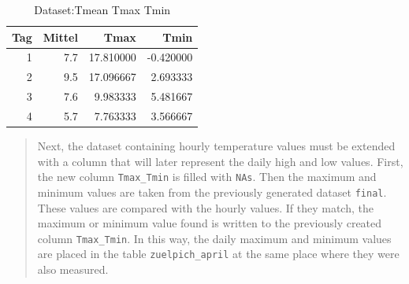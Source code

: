 \documentclass[
]{book}
\begin{document}
\begin{table}

\caption{\label{tab:unnamed-chunk-21}Dataset:Tmean Tmax Tmin}
\fontsize{10}{12}\selectfont
\begin{tabular}[t]{r|r|r|r}
\hline
Tag & Mittel & Tmax & Tmin\\
\hline
1 & 7.7 & 17.810000 & -0.420000\\
\hline
2 & 9.5 & 17.096667 & 2.693333\\
\hline
3 & 7.6 & 9.983333 & 5.481667\\
\hline
4 & 5.7 & 7.763333 & 3.566667\\
\hline
\end{tabular}
\end{table}

\begin{quote}
Next, the dataset containing hourly temperature values must be extended with a column that will later represent the daily high and low values. First, the new column \texttt{Tmax\_Tmin} is filled with \texttt{NAs}. Then the maximum and minimum values are taken from the previously generated dataset \texttt{final}. These values are compared with the hourly values. If they match, the maximum or minimum value found is written to the previously created column \texttt{Tmax\_Tmin}. In this way, the daily maximum and minimum values are placed in the table \texttt{zuelpich\_april} at the same place where they were also measured.
\end{quote}
\end{document}
